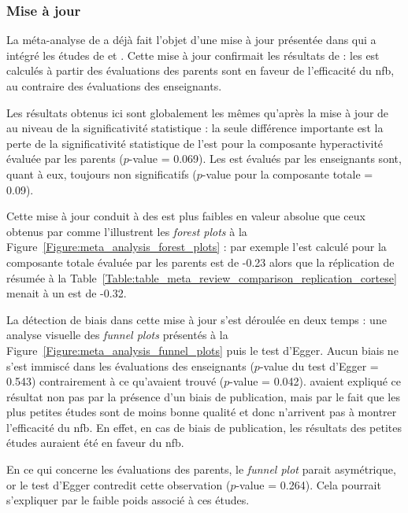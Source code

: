 \subsubsection{Mise à jour} \label{meta_analysis_update}

La méta-analyse de \citep{Cortese2016} a déjà fait l'objet d'une mise à jour présentée dans \citet{Bussalb2019clinical} qui a intégré les études de 
\citep{Bazanova2018, Baumeister2016} et \citet{Strehl2017}. Cette mise à jour confirmait les résultats de \citep{Cortese2016} : les \gls{est} calculés 
à partir des évaluations des parents sont en faveur de l'efficacité du \gls{nfb}, au contraire des évaluations des enseignants. 

Les résultats obtenus ici sont globalement les mêmes qu'après la mise à jour de \citet{Bussalb2019clinical} au niveau de la significativité statistique : la seule
différence importante est la perte de la significativité statistique de l'\gls{est} pour la composante hyperactivité évaluée par les parents ($p$-value = 0.069).
Les \gls{est} évalués par les enseignants sont, quant à eux, toujours non significatifs ($p$-value pour la composante totale =  0.09). 

Cette mise à jour conduit à des \gls{est} plus faibles en valeur absolue que ceux obtenus par \citet{Cortese2016} comme l'illustrent les \textit{forest plots} à 
la Figure~\ref{Figure:meta_analysis_forest_plots} : par exemple l'\gls{est} calculé pour la composante totale évaluée par les parents est de -0.23 alors
que la réplication de \citet{Cortese2016} résumée à la Table~\ref{Table:table_meta_review_comparison_replication_cortese} menait à un \gls{est} de -0.32.

La détection de biais dans cette mise à jour s'est déroulée en deux temps : une analyse visuelle des \textit{funnel plots} présentés à la Figure~\ref{Figure:meta_analysis_funnel_plots}
puis le test d'Egger. Aucun biais ne s'est immiscé dans les évaluations des enseignants ($p$-value du test d'Egger = 0.543) contrairement à ce qu'avaient trouvé \citet{Cortese2016} ($p$-value = 0.042). 
\citet{Cortese2016} avaient expliqué ce résultat non pas par la présence d'un biais de publication, mais par le fait que les plus petites études sont 
de moins bonne qualité et donc n'arrivent pas à montrer l'efficacité du \gls{nfb}. En effet, en cas de biais de publication, les résultats des petites
études auraient été en faveur du \gls{nfb}. 

En ce qui concerne les évaluations des parents, le \textit{funnel plot} parait asymétrique, or le test d'Egger contredit cette observation ($p$-value = 0.264). 
Cela pourrait s'expliquer par le faible poids associé à ces études. 

